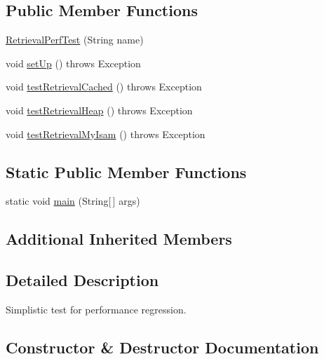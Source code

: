 \subsection*{Public Member Functions}
\begin{DoxyCompactItemize}
\item 
\mbox{\hyperlink{classtestsuite_1_1perf_1_1_retrieval_perf_test_abfe4d6c49777d60f2cb249cb5f72ef0d}{Retrieval\+Perf\+Test}} (String name)
\item 
void \mbox{\hyperlink{classtestsuite_1_1perf_1_1_retrieval_perf_test_aff556b7b6ac0eb46250902daf1153b3a}{set\+Up}} ()  throws Exception 
\item 
void \mbox{\hyperlink{classtestsuite_1_1perf_1_1_retrieval_perf_test_af70613a47b26a32ea960835584da6d3a}{test\+Retrieval\+Cached}} ()  throws Exception 
\item 
void \mbox{\hyperlink{classtestsuite_1_1perf_1_1_retrieval_perf_test_af8c1a7c2f684c76b0e310bf7a97c3258}{test\+Retrieval\+Heap}} ()  throws Exception 
\item 
void \mbox{\hyperlink{classtestsuite_1_1perf_1_1_retrieval_perf_test_a7228eef6533f6ff301ae53d044e25f9e}{test\+Retrieval\+My\+Isam}} ()  throws Exception 
\end{DoxyCompactItemize}
\subsection*{Static Public Member Functions}
\begin{DoxyCompactItemize}
\item 
static void \mbox{\hyperlink{classtestsuite_1_1perf_1_1_retrieval_perf_test_afb26b964fc63ebfdc34ed46e47a88ca5}{main}} (String\mbox{[}$\,$\mbox{]} args)
\end{DoxyCompactItemize}
\subsection*{Additional Inherited Members}


\subsection{Detailed Description}
Simplistic test for performance regression. 

\subsection{Constructor \& Destructor Documentation}
\mbox{\label{classtestsuite_1_1perf_1_1_retrieval_perf_test_abfe4d6c49777d60f2cb249cb5f72ef0d}} 
